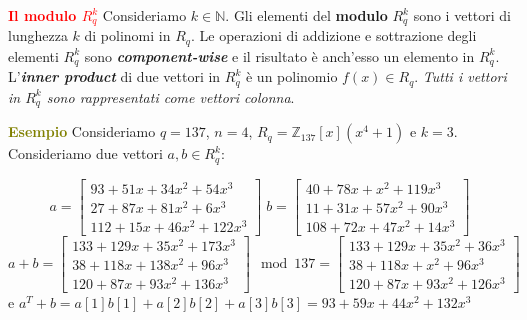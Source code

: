 \begin{flushleft}
    \textcolor{red}{\textbf{Il modulo $R_q^k$}} \newline
    Consideriamo $k \in \mathbb{N}$. Gli elementi del \textbf{modulo} $R_q^k$ sono i vettori di lunghezza $k$ di polinomi in $R_q$. Le operazioni di addizione e sottrazione degli elementi $R_q^k$ sono \textbf{\textit{component-wise}} e il risultato è anch'esso un elemento in $R_q^k$. L'\textbf{\textit{inner product}} di due vettori in $R_q^k$ è un polinomio $f(x) \in R_q$. \textit{Tutti i vettori in $R_q^k$ sono rappresentati come vettori colonna}.

    \begin{boxA}
        \textcolor{olive}{\textbf{Esempio}} \newline
        Consideriamo $q = 137$, $n=4$, $R_q = \mathbb{Z}_{137}[x](x^4+1)$ e $k=3$. Consideriamo due vettori $a, b \in R_q^k$:
        \vspace{-3.5em}

        {\centering
            \[
            a = \left[
                \begin{array}{l}
                    93 + 51x + 34x^2 + 54x^3 \\
                    27 + 87x + 81x^2 + 6x^3 \\
                    112 + 15x + 46x^2 + 122x^3
                \end{array}
            \right]
            \; 
            b = \left[
                \begin{array}{l}
                    40 + 78x + x^2 + 119x^3 \\
                    11 + 31x + 57x^2 + 90x^3 \\
                    108 + 72x + 47x^2 + 14x^3
                \end{array}
            \right]
            \]
            \vspace{-0.5em}
            \[
            a + b = \left[
                \begin{array}{l}
                    133 + 129x + 35x^2 + 173x^3 \\
                    38 + 118x + 138x^2 + 96x^3 \\
                    120 + 87x + 93x^2 + 136x^3
                \end{array}
            \right] \mod 137
            = \left[
                \begin{array}{l}
                    133 + 129x + 35x^2 + 36x^3 \\
                    38 + 118x + x^2 + 96x^3 \\
                    120 + 87x + 93x^2 + 126x^3
                \end{array}
            \right]
            \]
            e $a^T + b = a[1]b[1] + a[2]b[2] + a[3]b[3] = 93 + 59x + 44x^2 + 132x^3$ 
        \par}
    \end{boxA}
\end{flushleft}

